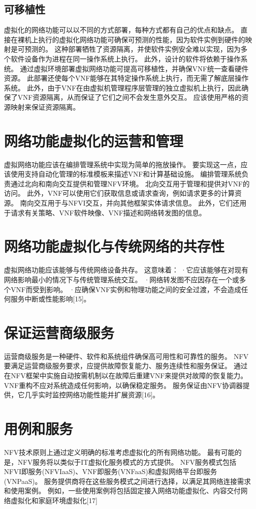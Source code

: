 \section{可移植性}
虚拟化的网络功能可以以不同的方式部署，每种方式都有自己的优点和缺点。
直接在裸机上执行的虚拟化网络功能可确保可预测的性能，因为软件实例到硬件的映射是可预测的。
这种部署牺牲了资源隔离，并使软件实例安全难以实现，因为多个软件设备作为进程在同一操作系统上执行。
此外，设计的软件将依赖于操作系统。
通过虚拟环境部署虚拟网络功能可提高可移植性，并确保VNF统一查看硬件资源。
此部署还使每个VNF能够在其特定操作系统上执行，而无需了解底层操作系统。
此外，由于VNF在由虚拟机管理程序层管理的独立虚拟机上执行，因此确保了VNF资源隔离，从而保证了它们之间不会发生意外交互。
应该使用严格的资源映射来保证资源隔离。

\chapter{网络功能虚拟化的运营和管理}
虚拟网络功能应该在编排管理系统中实现为简单的拖放操作。
要实现这一点，应该使用支持自动化管理的标准模板来描述VNF和计算基础设施。
编排管理系统负责通过北向和南向交互提供和管理NFV环境。
北向交互用于管理和提供对VNF的访问。
此外，VNF可以使用它们获取信息或请求查询，例如请求更多的计算资源。
南向交互用于与NFVI交互，并向其他框架实体请求信息。
此外，它们还用于请求有关策略、VNF软件映像、VNF描述和网络转发图的信息。

\chapter{网络功能虚拟化与传统网络的共存性}
虚拟网络功能应该能够与传统网络设备共存。
这意味着： ·它应该能够在对现有网络影响最小的情况下与传统管理系统交互。
·网络转发图不应因存在一个或多个VNF而受到影响。
·应确保VNF实例和物理功能之间的安全过渡，不会造成任何服务中断或性能影响[15]。

\chapter{保证运营商级服务}
运营商级服务是一种硬件、软件和系统组件确保高可用性和可靠性的服务。
NFV要满足运营商级服务要求，应提供故障恢复能力、服务连续性和服务保证。
通过在NFV框架中实施自动按需机制以在故障后重建VNF来提供对故障的恢复能力。
VNF重构不应对系统造成任何影响，以确保稳定服务。
服务保证由NFV协调器提供，它几乎实时监控网络功能性能并扩展资源[16]。

\chapter{用例和服务}
NFV技术原则上通过定义明确的标准考虑虚拟化的所有网络功能。
最有可能的是，NFV服务将以类似于IT虚拟化服务模式的方式提供。
NFV服务模式包括NFVI即服务(NFVIaaS)、VNF即服务(VNFaaS)和虚拟网络平台即服务(VNPaaS)。
服务提供商将在这些服务模式之间进行选择，以满足其网络连接需求和使用案例。
例如，一些使用案例将包括固定接入网络功能虚拟化、内容交付网络虚拟化和家庭环境虚拟化[17]

